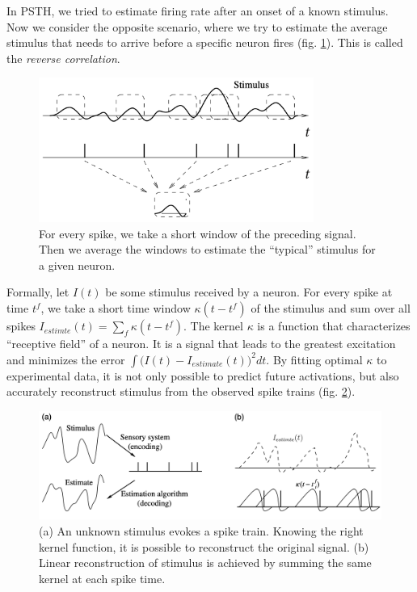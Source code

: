 \documentclass[oneside,english,logo]{amuthesis}
\begin{document}
In PSTH, we tried to estimate firing rate after an onset of a known stimulus. Now we consider the opposite scenario, where we  try to estimate the average stimulus that needs to arrive before a specific neuron fires (fig. \ref{fig:reverse_correlation}). This is called the \textit{reverse correlation}.
\begin{figure}[!htbp]
	\centering
	\includegraphics[width=9cm]{reverse_correlation}
	\caption{For every spike, we take a short window of the preceding signal. Then we average the windows to estimate the ``typical'' stimulus for a given neuron.}
	\label{fig:reverse_correlation}
\end{figure}
Formally, let $I(t)$ be some stimulus received by a neuron. For every spike at time $t^f$, we take a short time window $\kappa(t-t^f)$ of the stimulus and sum over all spikes $I_{estimte}(t)=\sum_f \kappa(t-t^f)$. The kernel $\kappa$ is a function that characterizes ``receptive field'' of a neuron. It is a signal that leads to the greatest excitation and minimizes the error $\int \big(I(t)-I_{estimate}(t)\big)^2dt$. By fitting optimal $\kappa$ to experimental data, it is not only possible to predict future activations, but also accurately reconstruct stimulus from the observed spike trains (fig. \ref{fig:reverse_correlation_estimate}).
\begin{figure}[!htbp]
	\centering
	\includegraphics[width=13cm]{reverse_correlation_estimate}
	\caption{(a)  An unknown stimulus evokes a spike train. Knowing the right kernel function, it is possible to reconstruct the original signal. (b) Linear reconstruction of stimulus is achieved by summing the same kernel at each spike time.}
	\label{fig:reverse_correlation_estimate}
\end{figure}
\end{document}
